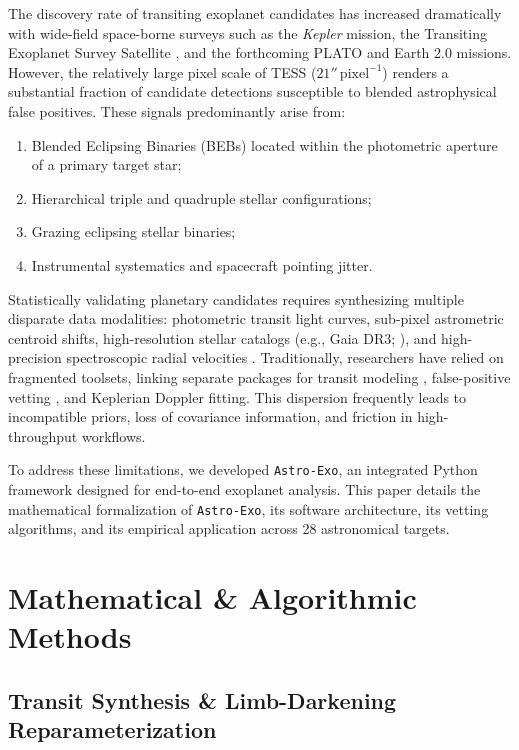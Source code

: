 \documentclass[twocolumn,trackchanges]{aastex631}
\newcommand{\astroexo}{\texttt{Astro-Exo}}
\begin{document}
The discovery rate of transiting exoplanet candidates has increased dramatically with wide-field space-borne surveys such as the \textit{Kepler} mission, the Transiting Exoplanet Survey Satellite \citep[TESS;][]{Ricker2015}, and the forthcoming PLATO and Earth 2.0 missions. However, the relatively large pixel scale of TESS ($21''\,\text{pixel}^{-1}$) renders a substantial fraction of candidate detections susceptible to blended astrophysical false positives. These signals predominantly arise from:
\begin{enumerate}
    \item Blended Eclipsing Binaries (BEBs) located within the photometric aperture of a primary target star;
    \item Hierarchical triple and quadruple stellar configurations;
    \item Grazing eclipsing stellar binaries;
    \item Instrumental systematics and spacecraft pointing jitter.
\end{enumerate}

Statistically validating planetary candidates requires synthesizing multiple disparate data modalities: photometric transit light curves, sub-pixel astrometric centroid shifts, high-resolution stellar catalogs (e.g., Gaia DR3; \citealt{GaiaDR3_2023}), and high-precision spectroscopic radial velocities \citep{Mayor2003, Pepe2021}. Traditionally, researchers have relied on fragmented toolsets, linking separate packages for transit modeling \citep[e.g., \texttt{batman};][]{Kreidberg2015}, false-positive vetting \citep[e.g., \texttt{TRICERATOPS};][]{Giacalone2021}, and Keplerian Doppler fitting. This dispersion frequently leads to incompatible priors, loss of covariance information, and friction in high-throughput workflows.

To address these limitations, we developed \astroexo, an integrated Python framework designed for end-to-end exoplanet analysis. This paper details the mathematical formalization of \astroexo, its software architecture, its vetting algorithms, and its empirical application across 28 astronomical targets.

\section{Mathematical \& Algorithmic Methods}
\label{sec:methods}

\subsection{Transit Synthesis \& Limb-Darkening Reparameterization}
\label{subsec:transit}
\end{document}
